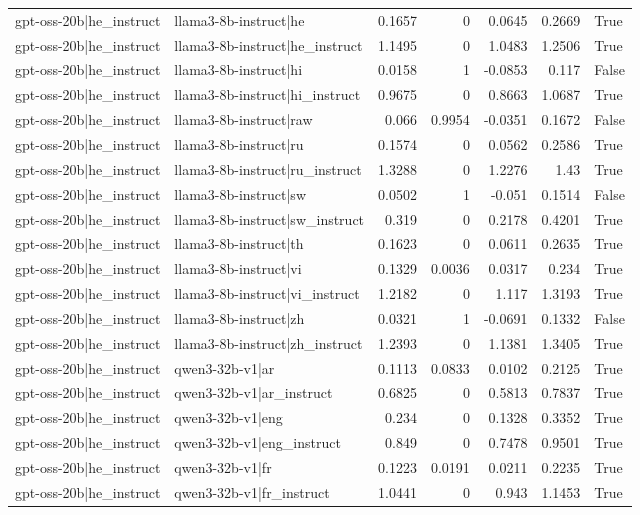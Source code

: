 \begin{table}
\begin{tabular}{l l r r r r l}
gpt-oss-20b|he_instruct & llama3-8b-instruct|he & 0.1657 & 0 & 0.0645 & 0.2669 & True \\
gpt-oss-20b|he_instruct & llama3-8b-instruct|he_instruct & 1.1495 & 0 & 1.0483 & 1.2506 & True \\
gpt-oss-20b|he_instruct & llama3-8b-instruct|hi & 0.0158 & 1 & -0.0853 & 0.117 & False \\
gpt-oss-20b|he_instruct & llama3-8b-instruct|hi_instruct & 0.9675 & 0 & 0.8663 & 1.0687 & True \\
gpt-oss-20b|he_instruct & llama3-8b-instruct|raw & 0.066 & 0.9954 & -0.0351 & 0.1672 & False \\
gpt-oss-20b|he_instruct & llama3-8b-instruct|ru & 0.1574 & 0 & 0.0562 & 0.2586 & True \\
gpt-oss-20b|he_instruct & llama3-8b-instruct|ru_instruct & 1.3288 & 0 & 1.2276 & 1.43 & True \\
gpt-oss-20b|he_instruct & llama3-8b-instruct|sw & 0.0502 & 1 & -0.051 & 0.1514 & False \\
gpt-oss-20b|he_instruct & llama3-8b-instruct|sw_instruct & 0.319 & 0 & 0.2178 & 0.4201 & True \\
gpt-oss-20b|he_instruct & llama3-8b-instruct|th & 0.1623 & 0 & 0.0611 & 0.2635 & True \\
gpt-oss-20b|he_instruct & llama3-8b-instruct|vi & 0.1329 & 0.0036 & 0.0317 & 0.234 & True \\
gpt-oss-20b|he_instruct & llama3-8b-instruct|vi_instruct & 1.2182 & 0 & 1.117 & 1.3193 & True \\
gpt-oss-20b|he_instruct & llama3-8b-instruct|zh & 0.0321 & 1 & -0.0691 & 0.1332 & False \\
gpt-oss-20b|he_instruct & llama3-8b-instruct|zh_instruct & 1.2393 & 0 & 1.1381 & 1.3405 & True \\
gpt-oss-20b|he_instruct & qwen3-32b-v1|ar & 0.1113 & 0.0833 & 0.0102 & 0.2125 & True \\
gpt-oss-20b|he_instruct & qwen3-32b-v1|ar_instruct & 0.6825 & 0 & 0.5813 & 0.7837 & True \\
gpt-oss-20b|he_instruct & qwen3-32b-v1|eng & 0.234 & 0 & 0.1328 & 0.3352 & True \\
gpt-oss-20b|he_instruct & qwen3-32b-v1|eng_instruct & 0.849 & 0 & 0.7478 & 0.9501 & True \\
gpt-oss-20b|he_instruct & qwen3-32b-v1|fr & 0.1223 & 0.0191 & 0.0211 & 0.2235 & True \\
gpt-oss-20b|he_instruct & qwen3-32b-v1|fr_instruct & 1.0441 & 0 & 0.943 & 1.1453 & True \\

\end{tabular}
\end{table}
